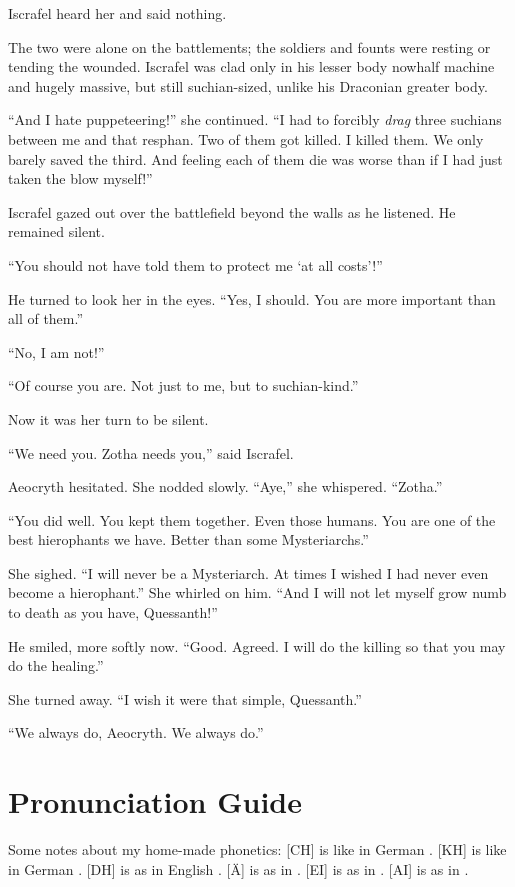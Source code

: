 \documentclass
  [a4paper,
   12pt,
   oneside
  ]%
  {article}
\begin{document}
Iscrafel heard her and said nothing. 

The two were alone on the battlements; the soldiers and founts were resting or tending the wounded.
Iscrafel was clad only in his lesser body now\dash{}half machine and hugely massive, but still suchian-sized, unlike his Draconian greater body. 

``And I hate puppeteering!'' she continued. 
``I had to forcibly \emph{drag} three suchians between me and that resphan. Two of them got killed. I killed them. We only barely saved the third. And feeling each of them die was worse than if I had just taken the blow myself!''

Iscrafel gazed out over the battlefield beyond the walls as he listened. 
He remained silent. 

``You should not have told them to protect me `at all costs'!''

He turned to look her in the eyes.
``Yes, I should. You are more important than all of them.''

``No, I am not!''

``Of course you are. Not just to me, but to suchian-kind.''

Now it was her turn to be silent. 

``We need you. Zotha needs you,'' said Iscrafel.

Aeocryth hesitated. She nodded slowly. ``Aye,'' she whispered. ``Zotha.''

``You did well. You kept them together. Even those humans. You are one of the best hierophants we have. Better than some Mysteriarchs.''

She sighed. 
``I will never be a Mysteriarch. At times I wished I had never even become a hierophant.'' 
She whirled on him. 
``And I will not let myself grow numb to death as you have, Quessanth!'' 

He smiled, more softly now. ``Good. Agreed. I will do the killing so that you may do the healing.''

She turned away. ``I wish it were that simple, Quessanth.''

``We always do, Aeocryth. We always do.''








\newpage
\appendix
\section{Pronunciation Guide}
Some notes about my home-made phonetics: 
[CH] is like in German . 
[KH] is like in German . 
[DH] is as in English . 
[Ä] is as in .
[EI] is as in .
[AI] is as in .    
\end{document}
